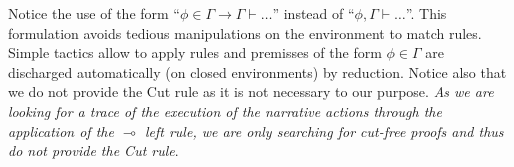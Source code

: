 \documentclass[runningheads,a4paper]{llncs}
\begin{document}
Notice the use of the form ``$\phi\in\Gamma \to \Gamma\vdash\dots$''
instead of ``$\phi,\Gamma\vdash\dots$''. This formulation avoids
tedious manipulations on the environment to match rules. Simple
tactics allow to apply rules and premisses of the form $\phi\in\Gamma$
are discharged automatically (on closed environments) by reduction.
Notice also that we do not provide the Cut rule as it is not necessary
to our purpose.
\emph{As we are looking for a trace of the execution of the narrative actions through the application of the $\multimap$ left rule, we are only searching for cut-free proofs and thus do not provide the Cut rule}.
\end{document}
